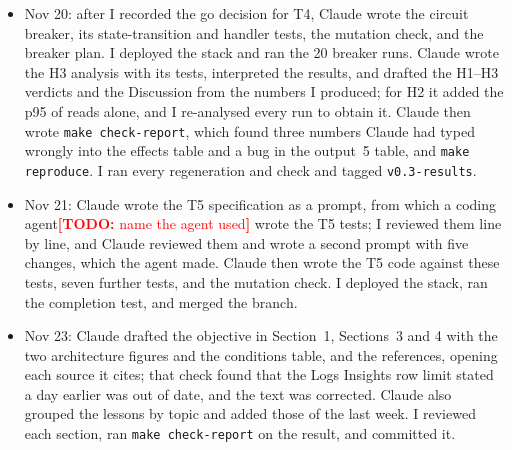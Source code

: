 \documentclass[10pt]{article}
\newcommand{\todo}[1]{\textcolor{red}{\textbf{[TODO:} #1\textbf{]}}}
\begin{document}
\begin{itemize}
  Claude; a check of the raw records that I ran showed it was right, because the
  warm-up had already created more environments than the ramp needed.
  \item Nov 20: after I recorded the go decision for T4, Claude wrote the
  circuit breaker, its state-transition and handler tests, the mutation check,
  and the breaker plan. I deployed the stack and ran the 20 breaker runs.
  Claude wrote the H3 analysis with its tests, interpreted the results, and
  drafted the H1--H3 verdicts and the Discussion from the numbers I produced;
  for H2 it added the p95 of reads alone, and I re-analysed every run to
  obtain it. Claude then wrote \texttt{make check-report}, which found three
  numbers Claude had typed wrongly into the effects table and a bug in the
  output~5 table, and \texttt{make reproduce}. I ran every regeneration and
  check and tagged \texttt{v0.3-results}.
  \item Nov 21: Claude wrote the T5 specification as a prompt, from which a
  coding agent\todo{name the agent used} wrote the T5 tests; I reviewed them
  line by line, and Claude reviewed them and wrote a second prompt with five
  changes, which the agent made. Claude then wrote the T5 code against these
  tests, seven further tests, and the mutation check. I deployed the stack,
  ran the completion test, and merged the branch.
  \item Nov 23: Claude drafted the objective in Section~1, Sections~3 and 4
  with the two architecture figures and the conditions table, and the
  references, opening each source it cites; that check found that the Logs
  Insights row limit stated a day earlier was out of date, and the text was
  corrected. Claude also grouped the lessons by topic and added those of the
  last week. I reviewed each section, ran \texttt{make check-report} on the
  result, and committed it.
\end{itemize}

\end{document}
